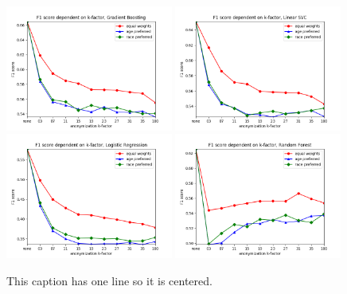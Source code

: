 \documentclass[a4paper,twoside]{article}
\begin{document}
\begin{figure}[!h]
	\centering
	\includegraphics[width=0.49\textwidth]{figures/anonymization/adults_education_num/gradient_boost}
	\includegraphics[width=0.49\textwidth]{figures/anonymization/adults_education_num/linear_svc}
	\includegraphics[width=0.49\textwidth]{figures/anonymization/adults_education_num/logistic_regression_lbfgs}
	\includegraphics[width=0.49\textwidth]{figures/anonymization/adults_education_num/random_forest}
	\caption{This caption has one line so it is centered.}
	\label{fig:results_anonymization_education_num}
\end{figure}
\end{document}
